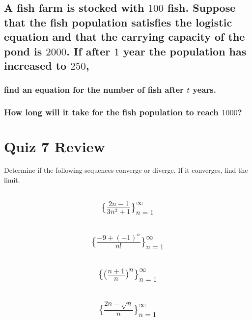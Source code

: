 \documentclass{article}
\begin{document}
\subsection{A fish farm is stocked with $100$ fish. Suppose that the fish population satisfies the logistic equation and that the carrying capacity of the pond is $2000$. If after $1$ year the population has increased to $250$,}
\subsubsection{find an equation for the number of fish after $t$ years.}
\subsubsection{How long will it take for the fish population to reach $1000$?}





\newpage
\section{Quiz 7 Review}
Determine if the following sequences converge or diverge. If it converges, find the limit.
\subsection{
	\begin{align*}
    		\biggl\{ \frac{2n - 1}{3n^2 + 1} \biggl\}_{n = 1}^{\infty}
	\end{align*}
}

\subsection{
	\begin{align*}
    		\biggl\{ \frac{-9 + (-1)^n}{n!} \biggl\}_{n = 1}^{\infty}
	\end{align*}
}

\subsection{
	\begin{align*}
    		\biggl\{ \bigg( \frac{n +1}{n} \bigg)^n \biggl\}_{n = 1}^{\infty}
	\end{align*}
}

\subsection{
	\begin{align*}
    		\biggl\{ \frac{2n - \sqrt{n}}{n} \biggl\}_{n = 1}^{\infty}
	\end{align*}
}
\end{document}
